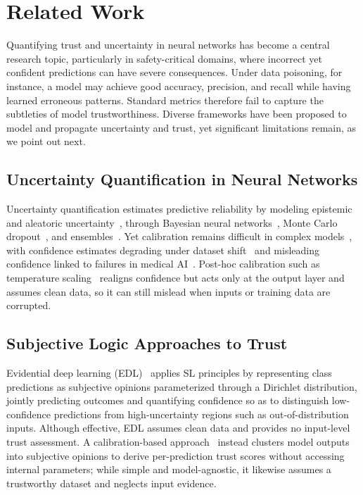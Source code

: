 \vspace{-0.5em}
\section{Related Work}\label{sec:rw}

Quantifying trust and uncertainty in neural networks has become a central research topic, particularly in safety-critical domains, where incorrect yet confident predictions can have severe consequences. Under data poisoning, for instance, a model may achieve good accuracy, precision, and recall while having learned erroneous patterns. Standard metrics therefore fail to capture the subtleties of model trustworthiness. Diverse frameworks have been proposed to model and propagate uncertainty and trust, yet significant limitations remain, as we point out next.
\vspace{-0.5em}
\subsection{Uncertainty Quantification in Neural Networks}

Uncertainty quantification estimates predictive reliability by modeling epistemic and aleatoric uncertainty~\cite{kendall2017uncertainties}, through Bayesian neural networks~\cite{neal1996bayesian,blundell2015weightuncertaintyneuralnetworks,pmlr-v80-depeweg18a}, Monte Carlo dropout~\cite{gal2016dropoutbayesianapproximationrepresenting}, and ensembles~\cite{lakshminarayanan2017simplescalablepredictiveuncertainty}. Yet calibration remains difficult in complex models~\cite{Gawlikowski2023}, with confidence estimates degrading under dataset shift~\cite{begoli2019need,2506.07461,1906.02530} and misleading confidence linked to failures in medical AI~\cite{wolf2025medvlms}. Post-hoc calibration such as temperature scaling~\cite{guo2017calibrationmodernneuralnetworks} realigns confidence but acts only at the output layer and assumes clean data, so it can still mislead when inputs or training data are corrupted.
\vspace{-0.5em}
\subsection{Subjective Logic Approaches to Trust}

Evidential deep learning (EDL)~\cite{sensoy2018evidentialdeeplearningquantify} applies SL principles by representing class predictions as subjective opinions parameterized through a Dirichlet distribution, jointly predicting outcomes and quantifying confidence so as to distinguish low-confidence predictions from high-uncertainty regions such as out-of-distribution inputs. Although effective, EDL assumes clean data and provides no input-level trust assessment. A calibration-based approach~\cite{11124121} instead clusters model outputs into subjective opinions to derive per-prediction trust scores without accessing internal parameters; while simple and model-agnostic, it likewise assumes a trustworthy dataset and neglects input evidence.

